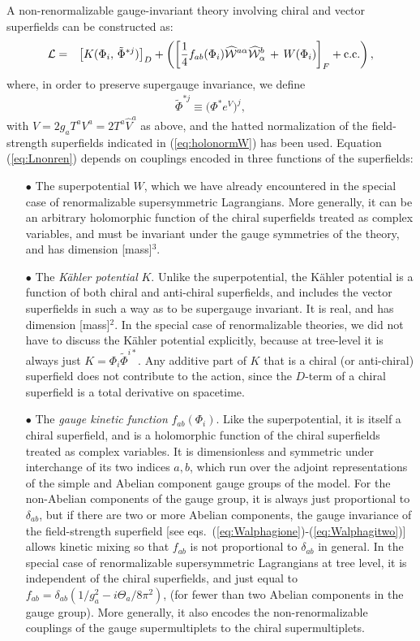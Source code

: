 \documentclass[11pt]{article}
\def\beq{\begin{eqnarray}}
\def\eeq{\end{eqnarray}}
\begin{document}
A non-renormalizable gauge-invariant theory involving chiral and vector 
superfields can be constructed as:
\beq
{\cal L} &=& \left [ K(\Phi_i, \, \tilde \Phi^{*j}) \right ]_D
+ \left ( 
\left [\frac{1}{4}  f_{ab}(\Phi_i) \widehat{\cal W}^{a\alpha} \widehat{\cal W}^b_\alpha 
\,+\, W(\Phi_i)
\right ]_F
+ {\rm c.c.}
\right ),
\label{eq:Lnonren}
\eeq
where, in order to preserve supergauge invariance, we define
\beq
\tilde \Phi^{*j} \equiv \bigl ( \Phi^{*} e^{V} \bigr )^j ,
\eeq
with $V = 2 g_a T^a V^a = 2 T^a \widehat V^a$ as above,
and the hatted normalization of the field-strength superfields indicated in 
(\ref{eq:holonormW}) has been used.
Equation (\ref{eq:Lnonren})
depends on couplings encoded in three functions of the 
superfields:
\begin{itemize}
\item[$\bullet$]
The superpotential $W$, which we have already encountered in the
special case of renormalizable supersymmetric Lagrangians. More 
generally, it can be an arbitrary
holomorphic function of the chiral superfields treated as complex 
variables, and 
must be invariant under the gauge symmetries of the theory, and has 
dimension [mass]$^3$. 
\item[$\bullet$]
The {\em K\"ahler potential} $K$. 
Unlike the
superpotential, the K\"ahler potential is a function of both chiral and 
anti-chiral superfields, and includes the vector superfields in such a way 
as to be supergauge invariant. It is real, and has dimension 
[mass]$^2$. In the special
case of renormalizable theories, we did not have to discuss the K\"ahler
potential explicitly, because at tree-level it is always just 
$K = \Phi_i \tilde \Phi^{i*}$.
Any additive part of $K$ that is a chiral (or anti-chiral) 
superfield does not contribute to the 
action, since the $D$-term of a chiral superfield is a total derivative 
on spacetime.
\item[$\bullet$]
The {\it gauge kinetic function} $f_{ab}(\Phi_i)$. Like the
superpotential, it is itself a chiral superfield, and is a holomorphic 
function of the chiral superfields 
treated as
complex variables. It is dimensionless and symmetric under interchange of
its two indices $a,b$, which run over the adjoint representations of the
simple and Abelian component gauge groups of the model. For the 
non-Abelian components of the gauge 
group, it is always just proportional to $\delta_{ab}$, but if there are
two or more Abelian components, the gauge invariance of the field-strength 
superfield [see eqs.~(\ref{eq:Walphagione})-(\ref{eq:Walphagitwo})] 
allows kinetic mixing so that
$f_{ab}$ is not proportional to $\delta_{ab}$ in general.
In the special case of renormalizable
supersymmetric Lagrangians at tree level, it is 
independent of the chiral superfields, and just 
equal to $f_{ab} = \delta_{ab}(1/g_a^2 - i \Theta_a/8 \pi^2)$, 
(for fewer than two Abelian components in the gauge group). More generally, it also
encodes the non-renormalizable couplings of the gauge supermultiplets
to the chiral supermultiplets.
\end{itemize}
\end{document}
